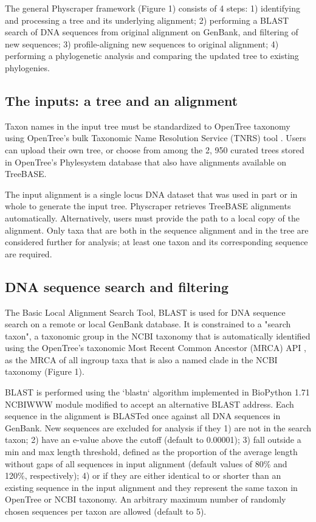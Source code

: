 \documentclass{bmcart}
\begin{document}
The general Physcraper framework (Figure 1) consists of 4 steps: 1) identifying and
processing a tree and its underlying alignment; 2) performing a BLAST search of
DNA sequences from original alignment on GenBank, and filtering of new sequences;
3) profile-aligning new sequences to original alignment; 4) performing a phylogenetic
analysis and comparing the updated tree to existing phylogenies.


\subsection*{The inputs: a tree and an alignment}

Taxon names in the input tree must be standardized to OpenTree taxonomy
\cite{rees2017automated} using OpenTree's bulk Taxonomic Name Resolution Service
(TNRS) tool \cite{TNRStool}. Users can upload their
own tree, or choose from among the 2, 950 curated trees stored in OpenTree's
Phylesystem database \cite{phylesystemGithub, mctavish2015phylesystem} that also have
alignments available on TreeBASE.

The input alignment is a single locus DNA dataset that was used in part or in
whole to generate the input tree. Physcraper retrieves TreeBASE alignments
automatically. Alternatively, users must provide the path to a local copy of the
alignment.
Only taxa that are both in the sequence alignment and in the tree are considered
further for analysis; at least one taxon and its corresponding sequence are required.

\subsection*{DNA sequence search and filtering}

The Basic Local Alignment Search Tool, BLAST \cite{altschul1990basic} is used for DNA
sequence search on a remote or local GenBank database. It is constrained to a
"search taxon", a taxonomic group in the NCBI taxonomy that is automatically
identified using the OpenTree's taxonomic Most Recent Common Ancestor (MRCA) API
\cite{mrcaAPI, rees2017automated}, as the MRCA of all ingroup taxa that is
also a named clade in the NCBI taxonomy (Figure 1).

BLAST is performed using the `blastn` algorithm \cite{camacho2009blast}
implemented in BioPython 1.71 \cite{cock2009biopython} NCBIWWW module \cite{ncbiwww}
modified to accept an alternative BLAST address.
Each sequence in the alignment is BLASTed once against all DNA sequences in GenBank.
New sequences are excluded for analysis if they 1) are not in the search taxon;
2) have an e-value above the cutoff (default to 0.00001); 3) fall outside a min
and max length threshold, defined as the proportion of the average length without
gaps of all sequences in input alignment (default values of 80\% and 120\%,
respectively); 4) or if they are either identical to or shorter than an existing
sequence in the input alignment and they represent the same taxon in OpenTree or
NCBI taxonomy.
An arbitrary maximum number of randomly chosen sequences per taxon are allowed
(default to 5).
\end{document}
